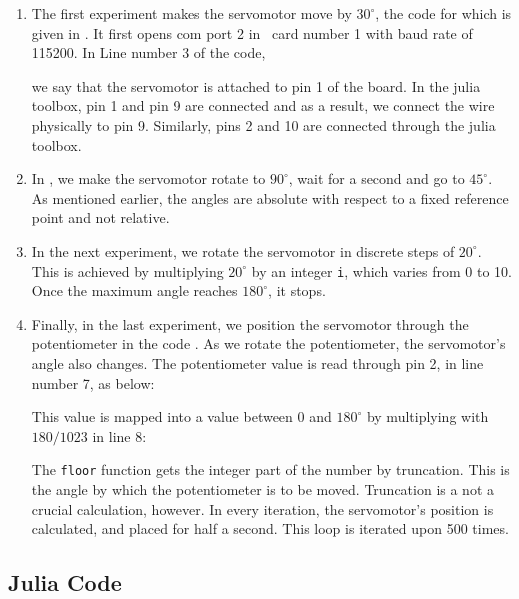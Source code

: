 \begin{enumerate}
\item The first experiment makes the servomotor move by $30^\circ$,
  the code for which is given in .
  It first opens com port 2 in \arduino\ card number 1 with baud rate
  of 115200.  In Line number 3 of the code, \ie\
  
  we say that the servomotor is attached to pin 1 of the board.
  In the julia toolbox, pin 1 and pin
  9 are connected and as a result, we connect the wire physically to
  pin 9.  Similarly, pins 2 and 10 are connected through the
  julia toolbox.

\item In , we make the servomotor rotate
  to $90^\circ$, wait for a second and go to $45^\circ$.  As mentioned
  earlier, the angles are absolute with respect to a fixed reference
  point and not relative.  

\item In the next experiment, we rotate the servomotor in discrete
  steps of $20^\circ$.  This is achieved by multiplying $20^\circ$ by
  an integer {\tt i}, which varies from 0 to 10.  Once the maximum
  angle reaches $180^\circ$, it stops.  

\item Finally, in the last experiment, we position the servomotor
  through the potentiometer in the code .  As we
  rotate the potentiometer, the servomotor's angle also changes.  The
  potentiometer value is read through pin 2, in line number 7, as
  below:
  
  This value is mapped into a value between 0 and $180^\circ$ by
  multiplying with $180/1023$ in line 8:
  
  The {\tt floor} function gets the integer part of the number by
  truncation.  This is the angle by which the potentiometer is to be
  moved.  Truncation is a not a crucial calculation, however.  In
  every iteration, the servomotor's position is calculated, and placed
  for half a second.  This loop is iterated upon 500 times.
\end{enumerate}

\subsection{Julia Code}
\lstset{style=mystyle}
\label{sec:servo-julia-code}

